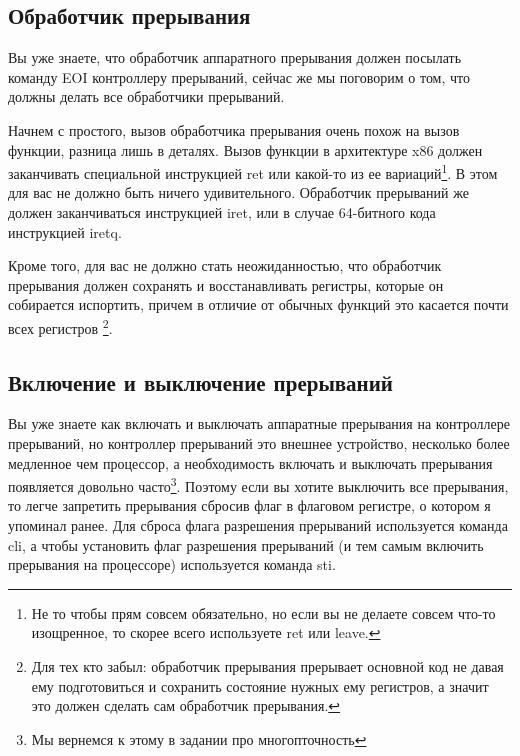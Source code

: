 \subsection{Обработчик прерывания}

Вы уже знаете, что обработчик аппаратного прерывания должен посылать команду EOI
контроллеру прерываний, сейчас же мы поговорим о том, что должны делать все
обработчики прерываний.

Начнем с простого, вызов обработчика прерывания очень похож на вызов функции,
разница лишь в деталях. Вызов функции в архитектуре x86 должен заканчивать
специальной инструкцией ret или какой-то из ее вариаций\footnote{Не то чтобы
прям совсем обязательно, но если вы не делаете совсем что-то изощренное, то
скорее всего используете ret или leave.}. В этом для вас не должно быть ничего
удивительного. Обработчик прерываний же должен заканчиваться инструкцией iret,
или в случае 64-битного кода инструкцией iretq.

Кроме того, для вас не должно стать неожиданностью, что обработчик прерывания
должен сохранять и восстанавливать регистры, которые он собирается испортить,
причем в отличие от обычных функций это касается почти всех регистров
\footnote{Для тех кто забыл: обработчик прерывания прерывает основной код не
давая ему подготовиться и сохранить состояние нужных ему регистров, а значит это
должен сделать сам обработчик прерывания.}.

\subsection{Включение и выключение прерываний}

Вы уже знаете как включать и выключать аппаратные прерывания на контроллере
прерываний, но контроллер прерываний это внешнее устройство, несколько более
медленное чем процессор, а необходимость включать и выключать прерывания
появляется довольно часто\footnote{Мы вернемся к этому в задании про
многопточность}. Поэтому если вы хотите выключить все прерывания, то легче
запретить прерывания сбросив флаг в флаговом регистре, о котором я упоминал
ранее. Для сброса флага разрешения прерываний используется команда cli, а чтобы
установить флаг разрешения прерываний (и тем самым включить прерывания на
процессоре) используется команда sti.
